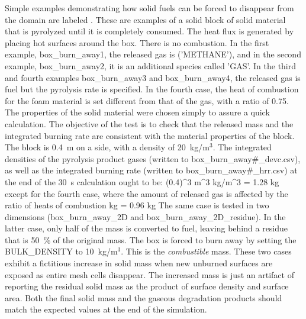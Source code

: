 \documentclass[11pt]{book}
\begin{document}
Simple examples demonstrating how solid fuels can be forced to disappear from the domain are labeled . These are examples of a solid block of solid material that is pyrolyzed until it is completely consumed. The heat flux is generated by placing hot surfaces around the box. There is no combustion. In the first
example, {\ct box\_burn\_away1}, the released gas is ({\ct 'METHANE'}), and in the second example, {\ct box\_burn\_away2}, it is an additional species called {\ct 'GAS'}. In the third and fourth examples {\ct box\_burn\_away3} and {\ct box\_burn\_away4}, the released gas is fuel but the pyrolysis rate is specified. In the fourth case, the heat of combustion for the foam material is set different from that of the gas, with a ratio of 0.75. The properties of the solid material were chosen simply to assure a quick calculation. The objective of the test is to
check that the released mass and the integrated burning rate are consistent with the material properties of the block. The block is 0.4~m on a side, with a density of 20~kg/m$^3$.  The integrated densities of the pyrolysis product gases (written to {\ct box\_burn\_away\#\_devc.csv}), as well as the integrated burning rate (written to {\ct box\_burn\_away\#\_hrr.csv}) at
the end of the 30~s calculation ought to be:
\be
(0.4)^3 \; \hbox{m}^3  \; \hbox{kg/m}^3 = 1.28 \; \hbox{kg}
\ee
except for the fourth case, where the amount of released gas is affected by the ratio of heats of combustion
  \; \hbox{kg}\; = 0.96 \; \hbox{kg}
\ee
The same case is tested in two dimensions ({\ct box\_burn\_away\_2D} and {\ct box\_burn\_away\_2D\_residue}). In the latter case, only half of the mass is converted to fuel, leaving behind a residue that is 50~\% of the original mass. The box is forced to burn away by setting the {\ct BULK\_DENSITY} to 10~kg/m$^3$. This is the {\em combustible} mass. These two cases exhibit a fictitious increase in solid mass when new unburned surfaces are exposed as entire mesh cells disappear. The increased mass is just an artifact of reporting the residual solid mass as the product of surface density and surface area. Both the final solid mass and the gaseous degradation products should match the expected values at the end of the simulation.
\end{document}
